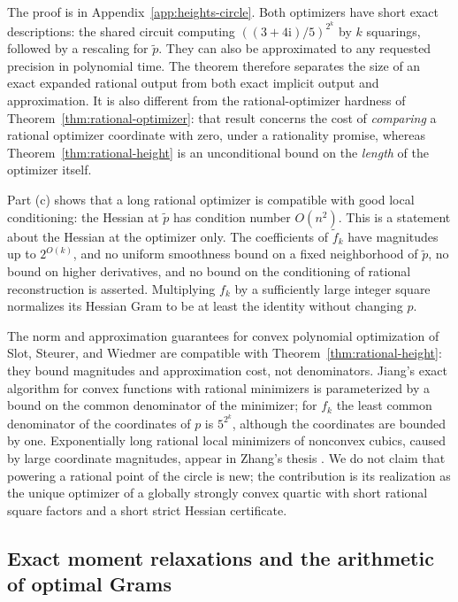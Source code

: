 The proof is in Appendix~\ref{app:heights-circle}. Both optimizers have
short exact descriptions: the shared circuit computing
$((3+4\mathrm i)/5)^{2^k}$ by $k$ squarings, followed by a rescaling for
$\tilde p$. They can also be approximated to any requested precision in
polynomial time. The theorem therefore separates the size of an exact
expanded rational output from both exact implicit output and approximation.
It is also different from the rational-optimizer hardness of
Theorem~\ref{thm:rational-optimizer}: that result concerns the cost of
\emph{comparing} a rational optimizer coordinate with zero, under a
rationality promise, whereas Theorem~\ref{thm:rational-height} is an
unconditional bound on the \emph{length} of the optimizer itself.

Part (c) shows that a long rational optimizer is compatible with good local
conditioning: the Hessian at $\tilde p$ has condition number $O(n^2)$. This is
a statement about the Hessian at the optimizer only. The coefficients of
$\tilde f_k$ have magnitudes up to $2^{O(k)}$, and no uniform smoothness
bound on a fixed neighborhood of $\tilde p$, no bound on higher derivatives,
and no bound on the conditioning of rational reconstruction is asserted.
Multiplying $f_k$ by a sufficiently large integer square normalizes its
Hessian Gram to be at least the identity without changing $p$.

The norm and approximation guarantees for convex polynomial optimization of
Slot, Steurer, and Wiedmer \cite{SlotSteurerWiedmer2025} are compatible
with Theorem~\ref{thm:rational-height}: they bound magnitudes and
approximation cost, not denominators. Jiang's exact algorithm for convex
functions with rational minimizers \cite{Jiang2021} is parameterized by a
bound on the common denominator of the minimizer; for $f_k$ the least common
denominator of the coordinates of $p$ is $5^{2^k}$, although the coordinates
are bounded by one. Exponentially
long rational local minimizers of nonconvex cubics, caused by large
coordinate magnitudes, appear in Zhang's thesis \cite[Example~2.5.3]{Zhang2020}.
We do not claim that powering a rational point of the circle is new; the
contribution is its realization as the unique optimizer of a globally
strongly convex quartic with short rational square factors and a short
strict Hessian certificate.

\subsection{Exact moment relaxations and the arithmetic of optimal Grams}
\label{sec:heights-moment}

